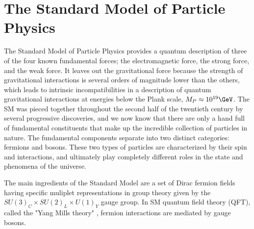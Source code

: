 \section{The Standard Model of Particle Physics}
\label{sec:sm}
The Standard Model of Particle Physics provides a quantum description of three of the four known fundamental forces; the electromagnetic force, the strong force, and the weak force.  It leaves out the gravitational force because the strength of gravitational interactions is several orders of magnitude lower than the others, which leads to intrinsic incompatibilities in a description of quantum gravitational interactions at energies below the Plank scale, $M_P\approx10^{19}\GeV$.  The SM was pieced together throughout the second half of the twentieth century by several progressive discoveries, and we now know that there are only a hand full of fundamental constituents that make up the incredible collection of particles in nature.  The fundamental components separate into two distinct categories: fermions and bosons.  These two types of particles are characterized by their spin and interactions, and ultimately play completely different roles in the state and phenomena of the universe. \cite{tully}

The main ingredients of the Standard Model are a set of Dirac fermion fields having specific muliplet representations in group theory given by the $SU(3)_{C} \times SU(2)_{L} \times U(1)_{Y}$ gauge group.  In SM quantum field theory (QFT), called the "Yang Mills theory" \cite{PhysRev.96.191}, fermion interactions are mediated by gauge bosons.  %

